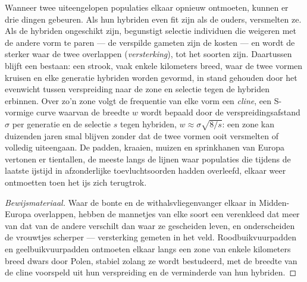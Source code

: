 \begin{proposition}\label{prop:b2:speciation:reinforcement}
Wanneer twee uiteengelopen populaties elkaar opnieuw ontmoeten, kunnen er drie
dingen gebeuren. Als hun hybriden even fit zijn als de ouders, versmelten ze.
Als de hybriden ongeschikt zijn, begunstigt selectie individuen die weigeren
met de andere vorm te paren --- de verspilde gameten zijn de kosten --- en
wordt de  sterker waar de twee overlappen
(\emph{versterking}), tot het soorten zijn. Daartussen blijft een
\emph{} bestaan: een strook, vaak enkele kilometers breed,
waar de twee vormen kruisen en elke generatie hybriden worden gevormd, in
stand gehouden door het evenwicht tussen verspreiding naar de zone en selectie
tegen de hybriden erbinnen. Over zo'n zone volgt de frequentie van elke vorm
een \emph{cline}, een S-vormige curve waarvan de breedte $w$ wordt bepaald door
de verspreidingsafstand $\sigma$ per generatie en de selectie $s$ tegen
hybriden, $w \approx
\sigma\sqrt{8/s}$: een zone kan duizenden jaren smal blijven zonder dat de
twee vormen ooit versmelten of volledig uiteengaan. De padden, kraaien, muizen
en sprinkhanen van Europa vertonen er tientallen, de meeste langs de lijnen
waar populaties die tijdens de laatste ijstijd in afzonderlijke
toevluchtsoorden hadden overleefd, elkaar weer ontmoetten toen het ijs zich
terugtrok.
\end{proposition}
\begin{proof}[Bewijsmateriaal]
Waar de bonte en de withalsvliegenvanger elkaar in Midden-Europa overlappen,
hebben de mannetjes van elke soort een verenkleed dat meer van dat van de
andere verschilt dan waar ze gescheiden leven, en onderscheiden de vrouwtjes
scherper --- versterking gemeten in het veld. Roodbuikvuurpadden en
geelbuikvuurpadden ontmoeten elkaar langs een zone van enkele kilometers breed
dwars door Polen, stabiel zolang ze wordt bestudeerd, met de breedte van de
cline voorspeld uit hun verspreiding en de verminderde  van hun
hybriden.
\end{proof}

